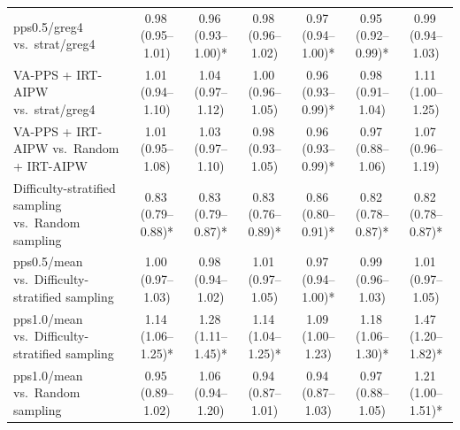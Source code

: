 \begin{tabular}{lcccccc}
pps0.5/greg4 vs.\ strat/greg4 & 0.98\,\scriptsize(0.95--1.01) & 0.96\,\scriptsize(0.93--1.00)* & 0.98\,\scriptsize(0.96--1.02) & 0.97\,\scriptsize(0.94--1.00)* & 0.95\,\scriptsize(0.92--0.99)* & 0.99\,\scriptsize(0.94--1.03) \\
VA-PPS + IRT-AIPW vs.\ strat/greg4 & 1.01\,\scriptsize(0.94--1.10) & 1.04\,\scriptsize(0.97--1.12) & 1.00\,\scriptsize(0.96--1.05) & 0.96\,\scriptsize(0.93--0.99)* & 0.98\,\scriptsize(0.91--1.04) & 1.11\,\scriptsize(1.00--1.25) \\
VA-PPS + IRT-AIPW vs.\ Random + IRT-AIPW & 1.01\,\scriptsize(0.95--1.08) & 1.03\,\scriptsize(0.97--1.10) & 0.98\,\scriptsize(0.93--1.05) & 0.96\,\scriptsize(0.93--0.99)* & 0.97\,\scriptsize(0.88--1.06) & 1.07\,\scriptsize(0.96--1.19) \\
Difficulty-stratified sampling vs.\ Random sampling & 0.83\,\scriptsize(0.79--0.88)* & 0.83\,\scriptsize(0.79--0.87)* & 0.83\,\scriptsize(0.76--0.89)* & 0.86\,\scriptsize(0.80--0.91)* & 0.82\,\scriptsize(0.78--0.87)* & 0.82\,\scriptsize(0.78--0.87)* \\
pps0.5/mean vs.\ Difficulty-stratified sampling & 1.00\,\scriptsize(0.97--1.03) & 0.98\,\scriptsize(0.94--1.02) & 1.01\,\scriptsize(0.97--1.05) & 0.97\,\scriptsize(0.94--1.00)* & 0.99\,\scriptsize(0.96--1.03) & 1.01\,\scriptsize(0.97--1.05) \\
pps1.0/mean vs.\ Difficulty-stratified sampling & 1.14\,\scriptsize(1.06--1.25)* & 1.28\,\scriptsize(1.11--1.45)* & 1.14\,\scriptsize(1.04--1.25)* & 1.09\,\scriptsize(1.00--1.23) & 1.18\,\scriptsize(1.06--1.30)* & 1.47\,\scriptsize(1.20--1.82)* \\
pps1.0/mean vs.\ Random sampling & 0.95\,\scriptsize(0.89--1.02) & 1.06\,\scriptsize(0.94--1.20) & 0.94\,\scriptsize(0.87--1.01) & 0.94\,\scriptsize(0.87--1.03) & 0.97\,\scriptsize(0.88--1.05) & 1.21\,\scriptsize(1.00--1.51)* \\
\bottomrule
\end{tabular}
